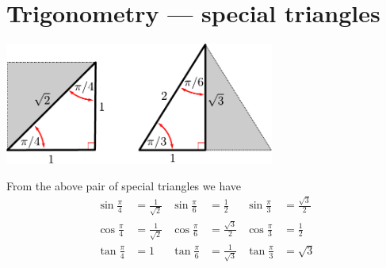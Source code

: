 \section{Trigonometry --- special triangles}
\begin{center}
  \includegraphics[height=4cm]{special_triangles}
\end{center}
From the above pair of special triangles we have
\begin{align*}
  \sin \frac{\pi}{4} &= \frac{1}{\sqrt{2}} &  \sin \frac{\pi}{6} &= \frac{1}{2} & \sin \frac{\pi}{3} &= \frac{\sqrt{3}}{2} \\
  \cos \frac{\pi}{4} &= \frac{1}{\sqrt{2}} &  \cos \frac{\pi}{6} &= \frac{\sqrt{3}}{2} & \cos \frac{\pi}{3} &= \frac{1}{2} \\
  \tan \frac{\pi}{4} &= 1 &  \tan \frac{\pi}{6} &= \frac{1}{\sqrt{3}} & \tan
\frac{\pi}{3} &= \sqrt{3}
\end{align*}

